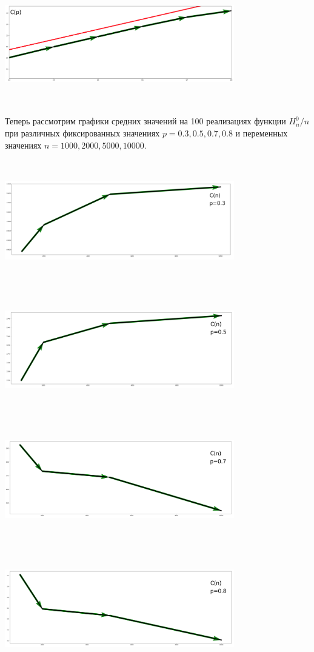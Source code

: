 \documentclass[10pt, reqno]{amsart}
\begin{document}
  \\\\
  \includegraphics[width=10cm, height=5cm]{c(p)_lin_zoom.png}
  \\\\
  Теперь рассмотрим графики средних значений на 100 реализациях функции $H_{n}^{0}/n$ при различных фиксированных значениях $p=0.3, 0.5, 0.7, 0.8$ и переменных значениях $n=1000, 2000, 5000, 10000$.\\\\
  \includegraphics[width=10cm, height=5cm]{c(n)_03.png}
  \\\\
  \includegraphics[width=10cm, height=5cm]{c(n)_05.png}
  \\\\
  \includegraphics[width=10cm, height=5cm]{c(n)_07.png}
  \\\\
  \includegraphics[width=10cm, height=5cm]{c(n)_08.png}
  \\\\
  \newpage
\end{document}
